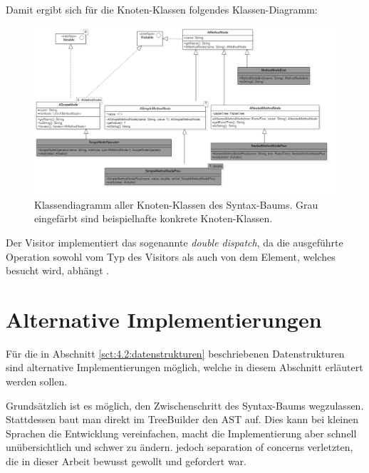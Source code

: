 Damit ergibt sich für die Knoten-Klassen folgendes Klassen-Diagramm:

\begin{figure}[H]
\centering\includegraphics[width=1.1\textwidth]{images/kapitel4/classDiagram1.png}
\caption{Klassendiagramm aller Knoten-Klassen des Syntax-Baums. Grau eingefärbt sind beispielhafte konkrete Knoten-Klassen.}
\label{fig:class-diagram1}
\end{figure}

Der Visitor implementiert das sogenannte \emph{double dispatch}, da die ausgeführte Operation sowohl vom Typ des Visitors als auch von dem Element, welches besucht wird, abhängt \cite{www:visitor-sourcemaking}.

\section{Alternative Implementierungen}\label{sct:4.4:alternativen}
Für die in Abschnitt \ref{sct:4.2:datenstrukturen} beschriebenen Datenstrukturen sind alternative Implementierungen möglich, welche in diesem Abschnitt erläutert werden sollen.

Grundsätzlich ist es möglich, den Zwischenschritt des Syntax-Baums wegzulassen. Stattdessen baut man direkt im TreeBuilder den AST auf. Dies kann bei kleinen Sprachen die Entwicklung vereinfachen, macht die Implementierung aber schnell unübersichtlich und schwer zu ändern.
jedoch separation of concerns verletzten, die in dieser Arbeit bewusst gewollt und gefordert war.

